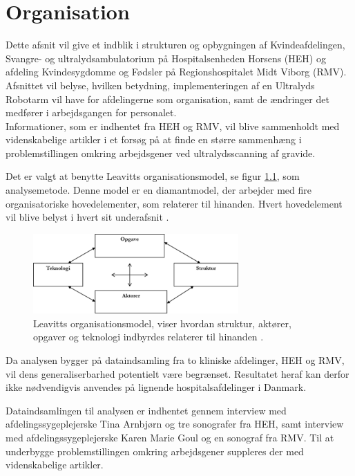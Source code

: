 \chapter{Organisation} \label{Organisation}
Dette afsnit vil give et indblik i strukturen og opbygningen af Kvindeafdelingen, Svangre- og ultralydsambulatorium på Hospitalsenheden Horsens (HEH) og afdeling Kvindesygdomme og Fødsler på Regionshospitalet Midt Viborg (RMV). Afsnittet vil belyse, hvilken betydning, implementeringen af en Ultralyds Robotarm vil have for afdelingerne som organisation, samt de ændringer det medfører i arbejdsgangen for personalet. \\
Informationer, som er indhentet fra HEH og RMV, vil blive sammenholdt med videnskabelige artikler i et forsøg på at finde en større sammenhæng i problemstillingen omkring arbejdsgener ved ultralydsscanning af gravide. 

Det er valgt at benytte Leavitts organisationsmodel, se figur \ref{DiamantModel}, som analysemetode. Denne model er en diamantmodel, der arbejder med fire organisatoriske hovedelementer, som relaterer til hinanden. Hvert hovedelement vil blive belyst i hvert sit underafsnit \cite{Leavitt} \cite{diamantmodel}. 

\begin{figure}[h!]\centering
	\includegraphics[width = 0.7\textwidth]{Figurer/LeavittModel}
	\caption{Leavitts organisationsmodel, viser hvordan struktur, aktører, opgaver og teknologi indbyrdes relaterer til hinanden \cite{diamantmodel}.}
	\label{DiamantModel}
\end{figure}

Da analysen bygger på dataindsamling fra to kliniske afdelinger, HEH og RMV, vil dens generaliserbarhed potentielt være begrænset. Resultatet heraf kan derfor ikke nødvendigvis anvendes på lignende hospitalsafdelinger i Danmark. 

Dataindsamlingen til analysen er indhentet gennem interview med afdelingssygeplejerske Tina Arnbjørn og tre sonografer fra HEH, samt interview med afdelingssygeplejerske Karen Marie Goul og en sonograf fra RMV.
Til at underbygge problemstillingen omkring arbejdsgener suppleres der med videnskabelige artikler.

